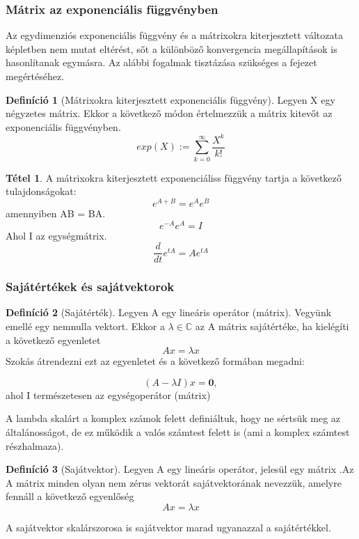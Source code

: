 \documentclass{article}
\theoremstyle{definition}
\theoremstyle{theorem}
\newtheorem{definition}{Definíció}
\newtheorem{theorem}{Tétel}
\begin{document}
\subsubsection{Mátrix az exponenciális függvényben}
Az egydimenziós exponenciális függvény és a mátrixokra kiterjesztett változata képletben nem mutat eltérést, sőt a különböző konvergencia megállapítások is hasonlítanak egymásra. Az alábbi fogalmak tisztázása szükséges a fejezet megértéséhez.
\begin{definition}[Mátrixokra kiterjesztett exponenciális függvény]
Legyen X egy négyzetes mátrix. Ekkor a következő módon értelmezzük a mátrix kitevőt az exponenciális függvényben.
\begin{equation*}
    exp(X) := \sum_{k=0}^{\infty} \frac{X^k}{k!}
\end{equation*}
\end{definition}
\begin{theorem}
A mátrixokra kiterjesztett exponenciáliss függvény tartja a következő tulajdonságokat:
        \begin{equation*}
            e^{A+B} = e^A  e^B
        \end{equation*}
        amennyiben AB = BA.
        \begin{equation*}
            e^{-A} e^{A} = I
        \end{equation*}
        Ahol I az egységmátrix.
        \begin{equation*}
            \frac{d}{dt} e^{tA} = A e^{tA}
        \end{equation*}
\end{theorem}
\subsubsection{Sajátértékek és sajátvektorok}
\begin{definition}[Sajátérték]
Legyen A egy lineáris operátor (mátrix). Vegyünk emellé egy nemnulla vektort. Ekkor a $ \lambda \in \mathbb{C}$ az A mátrix sajátértéke, ha kielégíti a következő egyenletet
\begin{equation*}
    Ax = \lambda x
\end{equation*}
Szokás átrendezni ezt az egyenletet és a következő formában megadni:

\begin{equation*}
    (A-\lambda I)x= \textbf{0},
\end{equation*}
ahol I természetesen az egységoperátor (mátrix)
\end{definition}
A lambda skalárt a komplex számok felett definiáltuk, hogy ne sértsük meg az általánosságot, de ez működik a valós számtest felett is (ami a komplex számtest részhalmaza).
\begin{definition}[Sajátvektor]
Legyen A egy lineáris operátor, jelesül egy mátrix .Az A mátrix minden olyan nem zérus  vektorát sajátvektorának nevezzük, amelyre fennáll a következő egyenlőség
\begin{equation*}
    Ax = \lambda x
\end{equation*}
\end{definition}
A sajátvektor skalárszorosa is sajátvektor marad ugyanazzal a sajátértékkel.
\end{document}
